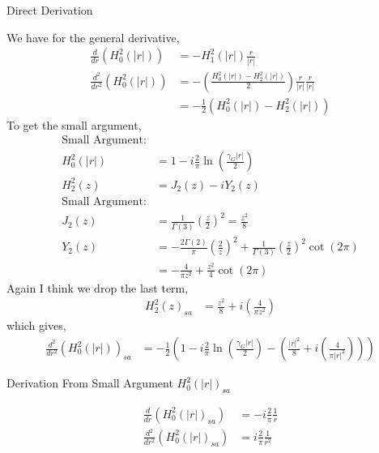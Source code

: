\documentclass{article}
\newcommand{\0}{\varnothing}
\begin{document}
\begin{minipage}[t]{0.5\textwidth}
{\centering Direct Derivation\ \\}

We have for the general derivative,
\begin{align*}
    \frac{d}{dr} \left(H_0^2(|r|)\right) &= -H_1^2(|r|) \frac{r}{|r|}\\
    \frac{d^2}{dr^2} \left(H_0^2(|r|)\right) &= -\left(\frac{H_0^2(|r|) - H_2^2 (|r|)}{2} \right) \frac{r}{|r|} \frac{r}{|r|}\\
                               &=-\frac{1}{2}\left(H_0^2(|r|) - H_2^2(|r|) \right)
\end{align*}
To get the small argument, 
\begin{align*}
\text{Small Argument:}&\\
    H_0^2(|r|) & = 1 - i \frac{2}{\pi} \ln \left( \frac{\gamma_G |r|}{2} \right)\\
    H_2^2(z) &= J_2(z) - i Y_2(z) \\
    \text{Small Argument:}& \\
    J_2(z) &= \frac{1}{\Gamma(3)} (\frac{z}{2})^2 = \frac{z^2}{8}\\
    Y_2(z) &= -\frac{2\Gamma(2)}{\pi} \left(\frac{2}{z}\right)^2 + \frac{1}{\Gamma(3)} \left(\frac{z}{2}\right)^2 \cot(2\pi) \\
           &= -\frac{4}{\pi z^2} + \frac{z^2}{4} \cot(2\pi)
\end{align*}
Again I think we drop the last term,
\begin{align*}
    H_2^2(z)_{sa} &=  \frac{z^2}{8} + i \left( \frac{4}{\pi z^2} \right) 
\end{align*}
which gives,
\begin{align*}
    \frac{d^2}{dr^2} \left( H_0^2(|r|) \right)_{sa} &= -\frac{1}{2} \left( 1 - i \frac{2}{\pi} \ln \left( \frac{\gamma_G |r|}{2} \right) - \left( \frac{|r|^2}{8} + i \left( \frac{4}{\pi |r|^2} \right) \right) \right)
\end{align*}
\end{minipage}
\begin{minipage}[t]{0.5\textwidth}
{\centering Derivation From Small Argument $H_0^2(|r|)_{sa}$\ \\}

\begin{align*}
\frac{d}{dr}\left(H_0^2(|r|)_{sa}\right) & =  - i \frac{2}{\pi} \frac{1}{r} \\
\frac{d^2}{dr^2}\left(H_0^2 (|r|)_{sa}\right) & =  i \frac{2}{\pi} \frac{1}{r^2} \\
\end{align*}

\end{minipage}
\end{document}
